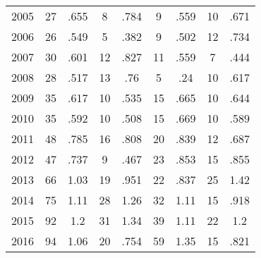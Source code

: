 \begin{table}[htbp]
\begin{tabular}{l*{8}{c}}
2005      &       27&     .655&        8&     .784&        9&     .559&       10&     .671\\
2006      &       26&     .549&        5&     .382&        9&     .502&       12&     .734\\
2007      &       30&     .601&       12&     .827&       11&     .559&        7&     .444\\
2008      &       28&     .517&       13&      .76&        5&      .24&       10&     .617\\
2009      &       35&     .617&       10&     .535&       15&     .665&       10&     .644\\
2010      &       35&     .592&       10&     .508&       15&     .669&       10&     .589\\
2011      &       48&     .785&       16&     .808&       20&     .839&       12&     .687\\
2012      &       47&     .737&        9&     .467&       23&     .853&       15&     .855\\
2013      &       66&     1.03&       19&     .951&       22&     .837&       25&     1.42\\
2014      &       75&     1.11&       28&     1.26&       32&     1.11&       15&     .918\\
2015      &       92&      1.2&       31&     1.34&       39&     1.11&       22&      1.2\\
2016      &       94&     1.06&       20&     .754&       59&     1.35&       15&     .821\\
\hline\hline
\end{tabular}
\end{table}
